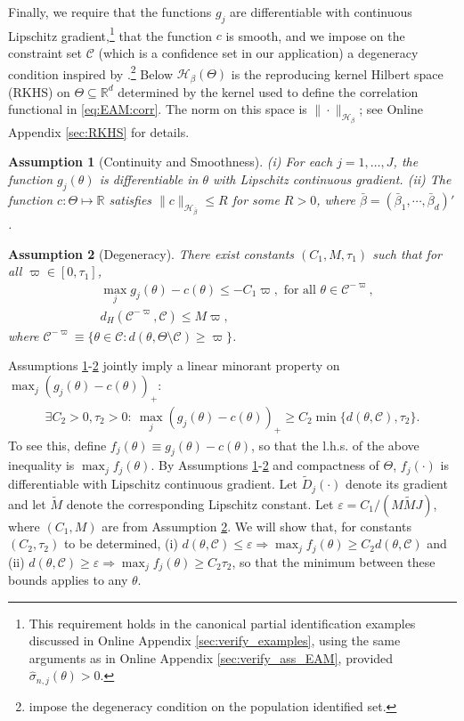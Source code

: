 \documentclass[letterpaper,11pt]{article}
\theoremstyle{myplain}
\theoremstyle{mydefinition}
\newtheorem{assumption}{Assumption}[section]
\theoremstyle{myremark}
\renewcommand{\cite}{\citet}
\newcommand{\cC}{\mathcal{C}}
\numberwithin{equation}{section}
\numberwithin{figure}{section}
\begin{document}
\begin{appendix}
Finally, we require that the functions $g_j$ are differentiable with continuous Lipschitz gradient,\footnote{This requirement holds in the canonical partial identification examples discussed in Online Appendix \ref{sec:verify_examples}, using the same arguments as in Online Appendix \ref{sec:verify_ass_EAM}, provided $\hat{\sigma}_{n,j}(\theta)>0$.} that the function $c$ is smooth, and we impose on the constraint set $\cC$ (which is a confidence set in our application) a degeneracy condition inspired by \cite[Condition C.3]{CHT}.\footnote{\cite{CHT} impose the degeneracy condition on the population identified set.}
Below $\mathcal H_{\beta}(\Theta)$ is the reproducing kernel Hilbert space (RKHS) on $ \Theta\subseteq \mathbb R^d$ determined by the kernel used to define the correlation functional in \eqref{eq:EAM:corr}. The norm on this space is $\|\cdot\|_{\mathcal H_{\beta}}$; see Online Appendix \ref{sec:RKHS} for details.
\begin{assumption}[Continuity and Smoothness]\label{as:smoothness}
(i) For each $j=1,\dots,J$, the function $g_j(\theta)$ is differentiable in $\theta$ with Lipschitz continuous gradient.
(ii) The function $c:\Theta \mapsto \mathbb{R}$ satisfies $\|c\|_{\mathcal H_{\bar\beta}}\le R$ for some $R>0$, where $\bar\beta=(\bar\beta_1,\cdots,\bar\beta_d)'$.
\end{assumption}
\begin{assumption}[Degeneracy]\label{as:degeneracy}
There exist constants $(C_1,M,\tau_1)$ such that for all $\varpi\in [0,\tau_1]$,
\begin{align*}
& \max_{j} g_j(\theta)-c(\theta)\le  -C_1\varpi, \text{ for all } \theta\in \mathcal C^{-\varpi},\\
& d_H(\mathcal C^{-\varpi},\mathcal C)\le M\varpi,
\end{align*}
where $\mathcal C^{-\varpi}\equiv\{\theta\in\mathcal C:d(\theta,\Theta\setminus \mathcal C)\ge \varpi\}$.
\end{assumption}
Assumptions \ref{as:smoothness}-\ref{as:degeneracy} jointly imply a linear minorant property on $\max_j(g_j(\theta)-c(\theta))_+$:
\begin{align}
\exists C_2>0,\tau_2>0: ~\max_j(g_j(\theta)-c(\theta))_+\ge C_2\min\{d(\theta,\mathcal C),\tau_2\}.\label{as:pm}
\end{align}
To see this, define $f_j(\theta)\equiv g_j(\theta)-c(\theta)$, so that the l.h.s. of the above inequality is $\max_j f_j(\theta)$. By Assumptions \ref{as:smoothness}-\ref{as:degeneracy} and compactness of $\Theta$,  $f_j(\cdot)$ is differentiable with Lipschitz continuous gradient. Let $\tilde{D}_j(\cdot)$ denote its gradient and let $\tilde{M}$ denote the corresponding Lipschitz constant. Let $\varepsilon=C_1/(M\tilde{M}J)$, where $(C_1,M)$ are from Assumption \ref{as:degeneracy}. We will show that, for constants $(C_2,\tau_2)$ to be determined, (i) $d(\theta,\cC) \leq \varepsilon \Rightarrow \max_j f_j(\theta) \geq C_2 d(\theta,\cC)$ and (ii) $d(\theta,\cC) \geq \varepsilon \Rightarrow \max_j f_j(\theta) \geq C_2 \tau_2$, so that the minimum between these bounds applies to any $\theta$.


\end{appendix}
\end{document}
